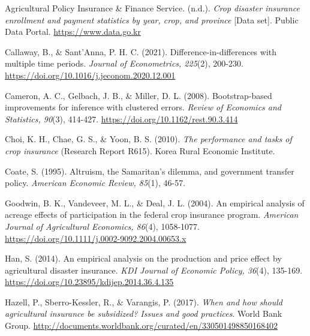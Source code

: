 \begingroup
{}
\begin{thebibliography}{}

Agricultural Policy Insurance \& Finance Service. (n.d.). \textit{Crop disaster insurance enrollment and payment statistics by year, crop, and province} [Data set]. Public Data Portal. \url{https://www.data.go.kr}

Callaway, B., \& Sant'Anna, P. H. C. (2021). Difference-in-differences with multiple time periods. \textit{Journal of Econometrics, 225}(2), 200-230. \url{https://doi.org/10.1016/j.jeconom.2020.12.001}

Cameron, A. C., Gelbach, J. B., \& Miller, D. L. (2008). Bootstrap-based improvements for inference with clustered errors. \textit{Review of Economics and Statistics, 90}(3), 414-427. \url{https://doi.org/10.1162/rest.90.3.414}

Choi, K. H., Chae, G. S., \& Yoon, B. S. (2010). \textit{The performance and tasks of crop insurance} (Research Report R615). Korea Rural Economic Institute.

Coate, S. (1995). Altruism, the Samaritan's dilemma, and government transfer policy. \textit{American Economic Review, 85}(1), 46-57.

Goodwin, B. K., Vandeveer, M. L., \& Deal, J. L. (2004). An empirical analysis of acreage effects of participation in the federal crop insurance program. \textit{American Journal of Agricultural Economics, 86}(4), 1058-1077. \url{https://doi.org/10.1111/j.0002-9092.2004.00653.x}

Han, S. (2014). An empirical analysis on the production and price effect by agricultural disaster insurance. \textit{KDI Journal of Economic Policy, 36}(4), 135-169. \url{https://doi.org/10.23895/kdijep.2014.36.4.135}

Hazell, P., Sberro-Kessler, R., \& Varangis, P. (2017). \textit{When and how should agricultural insurance be subsidized? Issues and good practices}. World Bank Group. \url{http://documents.worldbank.org/curated/en/330501498850168402}


\end{thebibliography}
